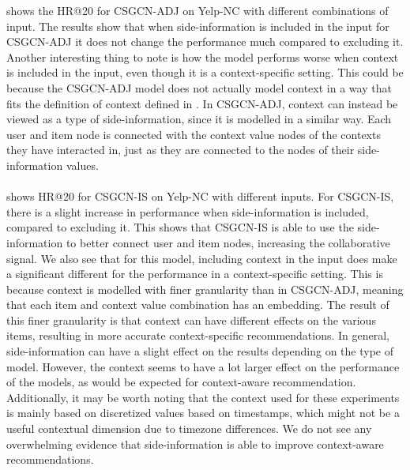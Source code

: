  shows the HR@20 for CSGCN-ADJ on Yelp-NC with different combinations of input. 
The results show that when side-information is included in the input for CSGCN-ADJ it does not change the performance much compared to excluding it.
Another interesting thing to note is how the model performs worse when context is included in the input, even though it is a context-specific setting.
This could be because the CSGCN-ADJ model does not actually model context in a way that fits the definition of context defined in .
In CSGCN-ADJ, context can instead be viewed as a type of side-information, since it is modelled in a similar way.
Each user and item node is connected with the context value nodes of the contexts they have interacted in, just as they are connected to the nodes of their side-information values.
\\\\
 shows HR@20 for CSGCN-IS on Yelp-NC with different inputs.
For CSGCN-IS, there is a slight increase in performance when side-information is included, compared to excluding it.
This shows that CSGCN-IS is able to use the side-information to better connect user and item nodes, increasing the collaborative signal.
We also see that for this model, including context in the input does make a significant different for the performance in a context-specific setting.
This is because context is modelled with finer granularity than in CSGCN-ADJ, meaning that each item and context value combination has an embedding.
The result of this finer granularity is that context can have different effects on the various items, resulting in more accurate context-specific recommendations.
In general, side-information can have a slight effect on the results depending on the type of model.
However, the context seems to have a lot larger effect on the performance of the models, as would be expected for context-aware recommendation.
Additionally, it may be worth noting that the context used for these experiments is mainly based on discretized values based on timestamps, which might not be a useful contextual dimension due to timezone differences.
We do not see any overwhelming evidence that side-information is able to improve context-aware recommendations.
